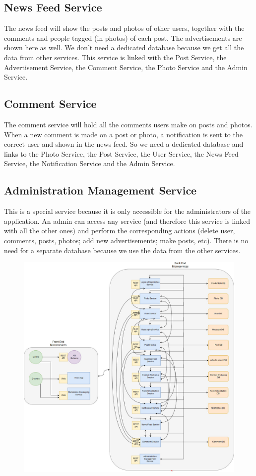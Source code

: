 \documentclass[a4paper,12pt]{article}
\begin{document}
\subsection{News Feed Service}

The news feed will show the posts and photos of other users, together with the comments and people tagged (in photos) of each post. The advertisements are shown here as well. We don't need a dedicated database because we get all the data from other services. This service is linked with the Post Service, the Advertisement Service, the Comment Service, the Photo Service and the Admin Service.

\subsection{Comment Service}

The comment service will hold all the comments users make on posts and photos. When a new comment is made on a post or photo, a notification is sent to the correct user and shown in the news feed. So we need a dedicated database and links to the Photo Service, the Post Service, the User Service, the News Feed Service, the Notification Service and the Admin Service. 

\subsection{Administration Management Service}

This is a special service because it is only accessible for the administrators of the application. An admin can access any service (and therefore this service is linked with all the other ones) and perform the corresponding actions (delete user, comments, posts, photos; add new advertisements; make posts, etc). There is no need for a separate database because we use the data from the other services.

\newpage

\begin{figure}
  \includegraphics[width=\linewidth]{architectureSchema.jpg}
\end{figure}
\end{document}
